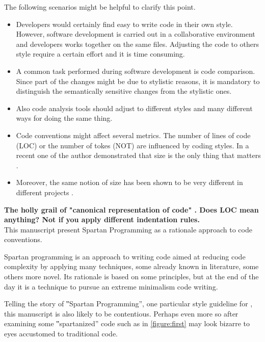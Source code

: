 The following scenarios might be helpful to clarify this point.
\begin{itemize}
    \item Developers would certainly find easy to write code in their own style. However, software
    development is carried out in a collaborative environment and developers works together on 
    the same files. Adjusting the code to others style require a certain effort and it is time consuming. 
    \item A common task performed during software development is code comparison. 
    Since part of the changes might be due to stylistic reasons, it is mandatory to distinguish the 
    semantically sensitive changes from the stylistic ones. 
    \item Also code analysis tools should adjust to different styles and many
        different ways for doing the same thing.
    \item Code conventions might affect several metrics. The number of lines of code (LOC) or the number of 
    tokes (NOT) are influenced by coding styles. In a recent one of the author demonstrated that size
      is the only thing that matters \cite{Gil:Lalouche:2016}.
    \item Moreover, the same notion of size has been shown to be very different in different projects \cite{Gil:Lalouche:2016}.
\end{itemize}

\textbf{The holly grail of "canonical representation of code" .
Does LOC mean anything?
Not if you apply different indentation rules.}\\

This manuscript present Spartan Programming as a rationale approach to code conventions. 

Spartan programming is an approach to writing code aimed at reducing code complexity by 
applying many techniques, some already known in literature, some others more novel. 
Its rationale is based on some principles, but at the end of the day it is a technique 
to pursue an extreme minimalism code writing.

Telling the story of ‟Spartan Programming”, one particular style guideline for
\Java, this manuscript is also likely to be contentious. Perhaps even more so
after examining some ‟spartanized” code such as in \cref{figure:first} 
may look bizarre to eyes accustomed to traditional \Java code.

